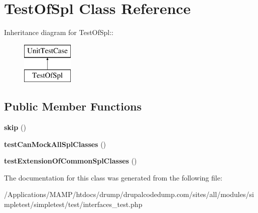 \hypertarget{class_test_of_spl}{
\section{TestOfSpl Class Reference}
\label{class_test_of_spl}
}
Inheritance diagram for TestOfSpl::\begin{figure}[H]
\begin{center}
\leavevmode
\includegraphics[height=2cm]{class_test_of_spl}
\end{center}
\end{figure}
\subsection*{Public Member Functions}
\begin{DoxyCompactItemize}
\item 
\hypertarget{class_test_of_spl_a3231c6543fb438c5da3d6a872eca5259}{
{\bfseries skip} ()}
\label{class_test_of_spl_a3231c6543fb438c5da3d6a872eca5259}

\item 
\hypertarget{class_test_of_spl_a5c0a98da4b4abc9c551783ffe69cb310}{
{\bfseries testCanMockAllSplClasses} ()}
\label{class_test_of_spl_a5c0a98da4b4abc9c551783ffe69cb310}

\item 
\hypertarget{class_test_of_spl_ad9d402259465aa766a44886ac9cc1b34}{
{\bfseries testExtensionOfCommonSplClasses} ()}
\label{class_test_of_spl_ad9d402259465aa766a44886ac9cc1b34}

\end{DoxyCompactItemize}


The documentation for this class was generated from the following file:\begin{DoxyCompactItemize}
\item 
/Applications/MAMP/htdocs/drump/drupalcodedump.com/sites/all/modules/simpletest/simpletest/test/interfaces\_\-test.php\end{DoxyCompactItemize}

